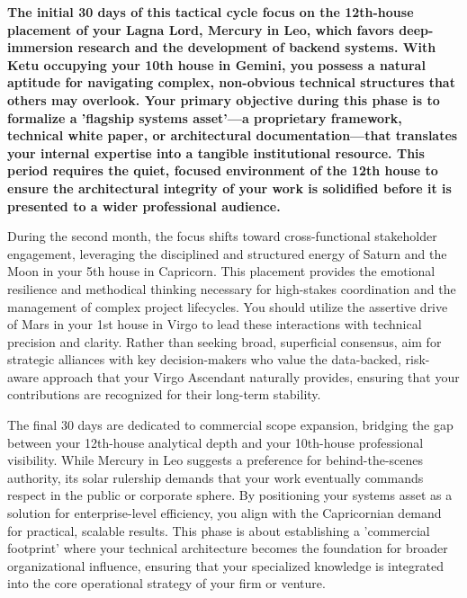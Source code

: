 \label{topic69}

{\fontsize{9.5}{13.8}\selectfont\bfseries\color{DeepSlate} The initial 30 days of this tactical cycle focus on the 12th-house placement of your Lagna Lord, Mercury in Leo, which favors deep-immersion research and the development of backend systems. With Ketu occupying your 10th house in Gemini, you possess a natural aptitude for navigating complex, non-obvious technical structures that others may overlook. Your primary objective during this phase is to formalize a 'flagship systems asset'---a proprietary framework, technical white paper, or architectural documentation---that translates your internal expertise into a tangible institutional resource. This period requires the quiet, focused environment of the 12th house to ensure the architectural integrity of your work is solidified before it is presented to a wider professional audience.}\par\vspace{2mm}

{\fontsize{9}{13}\selectfont During the second month, the focus shifts toward cross-functional stakeholder engagement, leveraging the disciplined and structured energy of Saturn and the Moon in your 5th house in Capricorn. This placement provides the emotional resilience and methodical thinking necessary for high-stakes coordination and the management of complex project lifecycles. You should utilize the assertive drive of Mars in your 1st house in Virgo to lead these interactions with technical precision and clarity. Rather than seeking broad, superficial consensus, aim for strategic alliances with key decision-makers who value the data-backed, risk-aware approach that your Virgo Ascendant naturally provides, ensuring that your contributions are recognized for their long-term stability.}\par\vspace{1.8mm}

{\fontsize{9}{13}\selectfont The final 30 days are dedicated to commercial scope expansion, bridging the gap between your 12th-house analytical depth and your 10th-house professional visibility. While Mercury in Leo suggests a preference for behind-the-scenes authority, its solar rulership demands that your work eventually commands respect in the public or corporate sphere. By positioning your systems asset as a solution for enterprise-level efficiency, you align with the Capricornian demand for practical, scalable results. This phase is about establishing a 'commercial footprint' where your technical architecture becomes the foundation for broader organizational influence, ensuring that your specialized knowledge is integrated into the core operational strategy of your firm or venture.}\par\vspace{1.8mm}

